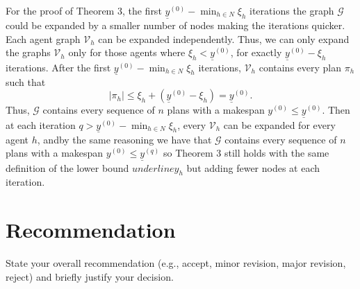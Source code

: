 \documentclass{article}
\begin{document}
For the proof of Theorem 3, the first \(\underline{y}^{(0)}- \min_{h \in N}\xi_h\) iterations the graph \(\mathcal{G}\) could be expanded by a smaller number of nodes making the iterations quicker.
Each agent graph \(\mathcal{V}_h\) can be expanded independently. Thus, we can only expand the graphs \(\mathcal{V}_h\) only for those agents where \(\xi_h < \underline{y}^{(0)}\), for exactly \( \underline{y}^{(0)} - \xi_h\) iterations.
After the first \(\underline{y}^{(0)}- \min_{h \in N}\xi_h\) iterations, \(\mathcal{V}_h\) contains every plan  \(\pi_h\) such that \[|\pi_h| \leq  \xi_h + (\underline{y}^{(0)}- \xi_h) = \underline{y}^{(0)}.\]
Thus, \(\mathcal{G}\) contains every sequence of \(n\) plans with a makespan \(y^{(0)} \leq \underline{y}^{(0)}\). Then at each iteration \(q > \underline{y}^{(0)} - \min_{h \in N}\xi_h\), every \(\mathcal{V}_h\) can be expanded for every agent \(h\), andby the same reasoning we have 
that \(\mathcal{G}\) contains every sequence of \(n\) plans with a makespan \(y^{(0)} \leq \underline{y}^{(q)}\) so Theorem 3 still holds with the same definition of the lower bound \(underline{y}_h\) but adding fewer nodes at each iteration.


\section*{Recommendation}

State your overall recommendation (e.g., accept, minor revision, major revision, reject) and briefly justify your decision.
\end{document}
